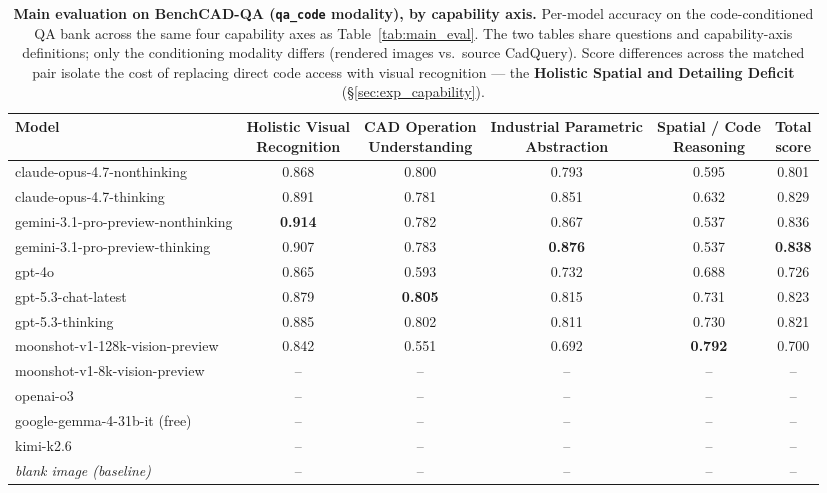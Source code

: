 \begin{table}[t]
\centering
\small
\setlength{\tabcolsep}{5pt}
\renewcommand{\arraystretch}{1.15}
\caption{\textbf{Main evaluation on BenchCAD-QA (\texttt{qa\_code} modality), by capability axis.} Per-model accuracy on the code-conditioned QA bank across the same four capability axes as Table~\ref{tab:main_eval}. The two tables share questions and capability-axis definitions; only the conditioning modality differs (rendered images vs.\ source CadQuery). Score differences across the matched pair isolate the cost of replacing direct code access with visual recognition --- the \textbf{Holistic Spatial and Detailing Deficit} (\S\ref{sec:exp_capability}).}
\label{tab:main_eval_code}
\begin{tabular}{l c c c c c}
\toprule
Model
 & \shortstack{Holistic Visual\\Recognition}
 & \shortstack{CAD Operation\\Understanding}
 & \shortstack{Industrial Parametric\\Abstraction}
 & \shortstack{Spatial / Code\\Reasoning}
 & \shortstack{Total\\score} \\
\midrule
claude-opus-4.7-nonthinking         & 0.868 & 0.800 & 0.793 & 0.595 & 0.801 \\
claude-opus-4.7-thinking            & 0.891 & 0.781 & 0.851 & 0.632 & 0.829 \\
gemini-3.1-pro-preview-nonthinking  & \textbf{0.914} & 0.782 & 0.867 & 0.537 & 0.836 \\
gemini-3.1-pro-preview-thinking     & 0.907 & 0.783 & \textbf{0.876} & 0.537 & \textbf{0.838} \\
gpt-4o                              & 0.865 & 0.593 & 0.732 & 0.688 & 0.726 \\
gpt-5.3-chat-latest                 & 0.879 & \textbf{0.805} & 0.815 & 0.731 & 0.823 \\
gpt-5.3-thinking                    & 0.885 & 0.802 & 0.811 & 0.730 & 0.821 \\
moonshot-v1-128k-vision-preview     & 0.842 & 0.551 & 0.692 & \textbf{0.792} & 0.700 \\
moonshot-v1-8k-vision-preview       & --    & --    & --    & --    & --    \\
openai-o3                           & --    & --    & --    & --    & --    \\
google-gemma-4-31b-it (free)        & --    & --    & --    & --    & --    \\
kimi-k2.6                           & --    & --    & --    & --    & --    \\
\midrule
\textit{blank image (baseline)}     & --    & --    & --    & --    & --    \\
\bottomrule
\end{tabular}
\end{table}
